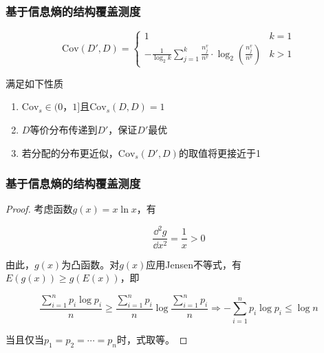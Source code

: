 \documentclass{../presentation}
\newcommand{\Cov}{\text{Cov}}
\begin{document}
    \begin{frame}
        \frametitle{基于信息熵的结构覆盖测度}

        \begin{equation}
            \Cov (D', D) = \begin{cases}
                1 & k=1 \\
                -\frac{1}{\log_2 k}\sum_{j=1}^k \frac{n_j^v}{n^v}\cdot \log_2\left(\frac{n_j^v}{n^v}\right) & k > 1
            \end{cases}
            \label{eq:1}
        \end{equation}

        满足如下性质

        \begin{enumerate}
            \item $\Cov_s \in (0，1]$且$\Cov_s(D,D)=1$
            \item $D$等价分布传递到$D'$，保证$D'$最优
            \item 若分配的分布更近似，$\Cov_s(D',D)$的取值将更接近于1
        \end{enumerate}

    \end{frame}

    \begin{frame}
        \frametitle{基于信息熵的结构覆盖测度}

        \begin{proof}
            考虑函数$g(x) = x\ln x$，有

            \begin{equation}
                \frac{\dd^2 g}{\dd x^2} = \frac{1}{x} > 0
            \end{equation}

            由此，$g(x)$为凸函数。对$g(x)$应用Jensen不等式，有$E(g(x)) \geq g(E(x))$，即

            \begin{equation}
                \frac{\sum_{i=1}^n p_i\log p_i}{n}\geq \frac{\sum_{i=1}^n p_i}{n}\log \frac{\sum_{i=1}^n p_i}{n} \Rightarrow -\sum_{i=1}^n p_i\log p_i \leq \log n
                \label{eq:2}
            \end{equation}

            当且仅当$p_1 = p_2 = \cdots = p_n$时，式取等。
        \end{proof}

    \end{frame}
\end{document}
